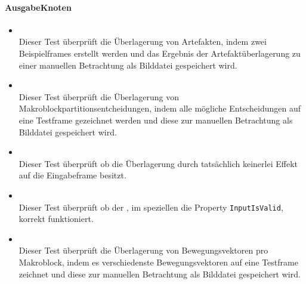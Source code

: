 \paragraph{AusgabeKnoten}

\begin{itemize}

\item{}~\\
Dieser Test überprüft die Überlagerung von Artefakten, indem zwei Beispielframes erstellt werden und das Ergebnis der Artefaktüberlagerung zu einer manuellen Betrachtung als Bilddatei gespeichert wird.

\item{}~\\
Dieser Test überprüft die Überlagerung von Makroblockpartitionsentcheidungen, indem alle mögliche Entscheidungen auf eine Testframe gezeichnet werden und diese zur manuellen Betrachtung als Bilddatei gespeichert wird.

\item{}~\\
Dieser Test überprüft ob die Überlagerung durch  tatsächlich keinerlei Effekt auf die Eingabeframe besitzt.

\item{}~\\
Dieser Test überprüft ob der , im speziellen die Property \verb#InputIsValid#, korrekt funktioniert.

\item{}~\\
Dieser Test überprüft die Überlagerung von Bewegungsvektoren pro Makroblock, indem es verschiedenste Bewegungsvektoren auf eine Testframe zeichnet und diese zur manuellen Betrachtung als Bilddatei gespeichert wird.

\end{itemize}

\subsection{}

\subsection{}

\subsection{}
